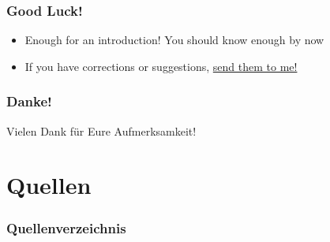 \documentclass{beamer}
\newcommand{\hrefcol}[2]{\textcolor{cyan}{\href{#1}{#2}}}
\begin{document}
\begin{frame}
    \frametitle{Good Luck!}
    \begin{itemize}
        \item Enough for an introduction! You should know enough by now
        \item If you have corrections or suggestions,
              \hrefcol{mailto:andrea@gasparini.cloud}{send them to me!}
    \end{itemize}
\end{frame}

\begin{frame}
    \frametitle{Danke!}
    \begin{center}
        \LARGE{Vielen Dank für Eure Aufmerksamkeit!}
    \end{center}
\end{frame}

\section{Quellen}

\begin{frame}[allowframebreaks]
    \frametitle{Quellenverzeichnis}
    
    
\end{frame}
\end{document}
